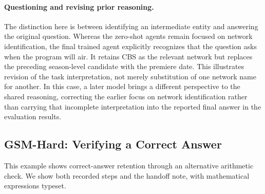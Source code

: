 \paragraph{Questioning and revising prior reasoning.}
The distinction here is between identifying an intermediate entity and answering the original question. Whereas the zero-shot agents remain focused on network identification, the final trained agent explicitly recognizes that the question asks when the program will air. It retains CBS as the relevant network but replaces the preceding season-level candidate with the premiere date. This illustrates revision of the task interpretation, not merely substitution of one network name for another. In this case, a later model brings a different perspective to the shared reasoning, correcting the earlier focus on network identification rather than carrying that incomplete interpretation into the reported final answer in the evaluation results.

\FloatBarrier

\noindent\begin{minipage}{\linewidth}
\subsection{GSM-Hard: Verifying a Correct Answer}
\label{app:case_gsm_hard}

This example shows correct-answer retention through an alternative arithmetic check. We show both recorded steps and the handoff note, with mathematical expressions typeset.

\begingroup
\setlength{\fboxsep}{7pt}
\endgroup
\end{minipage}\par

